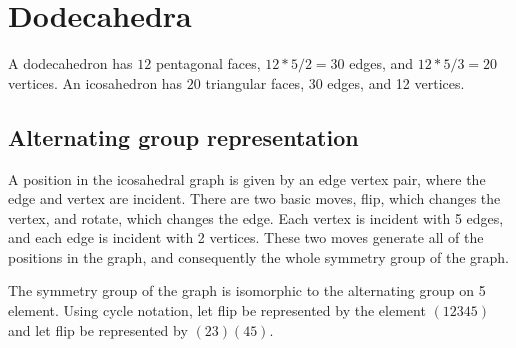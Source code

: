 \documentclass{article}
\begin{document}
\section{Dodecahedra}
A dodecahedron has $12$ pentagonal faces, $12*5/2=30$ edges, and $12*5/3=20$ vertices. An icosahedron has $20$ triangular faces, 30 edges, and 12 vertices.

\subsection{Alternating group representation}
A position in the icosahedral graph is given by an edge vertex pair, where the edge and vertex are incident. There are two basic moves, flip, which changes the vertex, and rotate, which changes the edge. Each vertex is incident with 5 edges, and each edge is incident with 2 vertices. These two moves generate all of the positions in the graph, and consequently the whole symmetry group of the graph.

The symmetry group of the graph is isomorphic to the alternating group on 5 element. Using cycle notation, let flip be represented by the element $(12345)$ and let flip be represented by $(23)(45)$.
\end{document}
